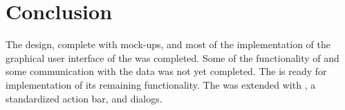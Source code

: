
\chapter{Conclusion}
\label{cha:conclusion_sprint_2}

The design, complete with mock-ups, and most of the implementation of the graphical user interface of the \ct was completed. Some of the functionality of \ct and some communication with the data was not yet completed. The \ct is ready for implementation of its remaining functionality. The \gc was extended with , a standardized action bar, and dialogs.  